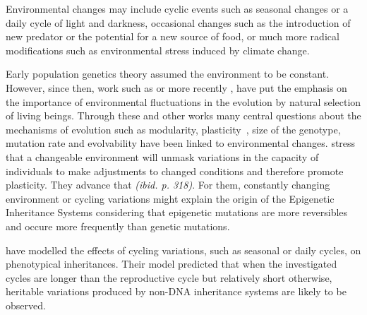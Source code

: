 Environmental changes may include cyclic events such as seasonal changes or a daily cycle of light and darkness, occasional changes such as the introduction of new predator or the potential for a new source of food, or much more radical modifications such as environmental stress induced by climate change.

Early population genetics theory assumed the environment to be constant. However, since then, work such as \citep{levins1968evolution} or more recently \citep{jablonka2014evolution}, have put the emphasis on the importance of environmental fluctuations in the evolution by natural selection of living beings. Through these and other works many central questions about the mechanisms of evolution such as modularity, plasticity~\citep{west2005developmental}, size of the genotype, mutation rate and evolvability have been linked to environmental changes. \cite{jablonka2014evolution} stress that a changeable environment will unmask variations in the capacity of individuals to make adjustments to changed conditions and therefore promote plasticity. They advance that \emph{(ibid. p. 318)}. For them, constantly changing environment or cycling variations might explain the origin of the Epigenetic Inheritance Systems  considering that epigenetic mutations are more reversibles and occure more frequently than genetic mutations. 

\cite{lachmann1996inheritance} have modelled the effects of cycling variations, such as seasonal or daily cycles, on phenotypical inheritances. Their model predicted that when the investigated cycles are longer than the reproductive cycle but relatively short otherwise, heritable variations produced by non-DNA inheritance systems are likely to be observed. 

